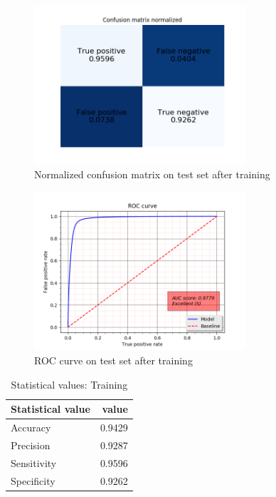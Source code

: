 \begin{figure}[H]
\center
\includegraphics[width=0.7\textwidth]{pictures/train_cm_normalized.png}
\caption{\label{fig:train_normalized_cm}Normalized confusion matrix on test set after training}
\end{figure}

\begin{figure}[H]
\center
\includegraphics[width=0.7\textwidth]{pictures/train_roc.png}
\caption{\label{fig:train_roc}ROC curve on test set after training}
\end{figure}

\begin{table}[H]
\centering
\begin{tabular}{l | r} %
Statistical value & value\\\hline
Accuracy & 0.9429 \\
Precision & 0.9287 \\
Sensitivity & 0.9596 \\
Specificity & 0.9262 \\
\end{tabular}
\caption{\label{tab:stat_table}Statistical values: Training}
\end{table}

